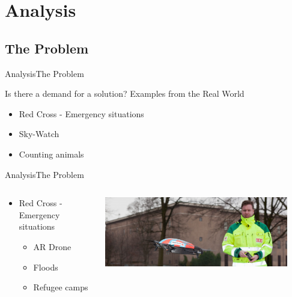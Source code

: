 \author{Bjarke H. Søndergaard}



\section{Analysis}
\subsection{The Problem}
\begin{frame}{Analysis}{The Problem}
    \begin{block}{Is there a demand for a solution?}
    Examples from the Real World
    \begin{itemize}
        \item Red Cross - Emergency situations
        \item Sky-Watch
        \item Counting animals
    \end{itemize}
    \end{block}
\end{frame}

\begin{frame}{Analysis}{The Problem}
    \begin{columns}[T]
        \begin{column}{.5\textwidth}
            \begin{itemize}
                \item Red Cross - Emergency situations
                \begin{itemize}
                    \item AR Drone
                    \item Floods
                    \item Refugee camps
                \end{itemize}
            \end{itemize}
        \end{column}
        \begin{column}{.5\textwidth}
            \includegraphics[width=0.9\textwidth]{images/red-cross_drone.png}
        \end{column}
    \end{columns}
\end{frame}

